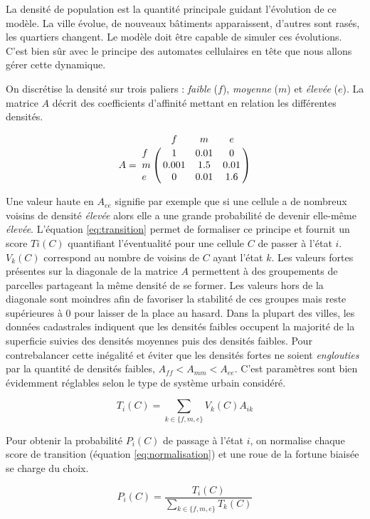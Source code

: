 \documentclass[12pt]{article}
\begin{document}
La densité de population est la quantité principale guidant
l'évolution de ce modèle. La ville évolue, de nouveaux bâtiments
apparaissent, d'autres sont rasés, les quartiers changent. Le modèle
doit être capable de simuler ces évolutions. C'est bien sûr avec le
principe des automates cellulaires en tête que nous allons gérer cette
dynamique.

On discrétise la densité sur trois paliers : \textit{faible} ($f$),
\textit{moyenne} ($m$) et \textit{élevée} ($e$). La matrice $A$ décrit
des coefficients d'affinité mettant en relation les différentes
densités.

\begin{equation}
A =
\bordermatrix{
    & f & m & e \cr
  f & 1 & 0.01 & 0 \cr
  m & 0.001 & 1.5 & 0.01 \cr
  e & 0 & 0.01 & 1.6
}
\end{equation}

Une valeur haute en $A_{ee}$ signifie par exemple que si une cellule a
de nombreux voisins de densité \textit{élevée} alors elle a une grande
probabilité de devenir elle-même \textit{élevée}. L'équation
\ref{eq:transition} permet de formaliser ce principe et fournit un
score $Ti(C)$ quantifiant l'éventualité pour une cellule $C$ de passer
à l'état $i$. $V_k(C)$ correspond au nombre de voisins de $C$ ayant
l'état $k$. Les valeurs fortes présentes sur la diagonale de la
matrice $A$ permettent à des groupements de parcelles partageant la
même densité de se former. Les valeurs hors de la diagonale sont
moindres afin de favoriser la stabilité de ces groupes mais reste
supérieures à 0 pour laisser de la place au hasard. Dans la plupart
des villes, les données cadastrales indiquent que les densités faibles
occupent la majorité de la superficie suivies des densités moyennes
puis des densités faibles. Pour contrebalancer cette inégalité et
éviter que les densités fortes ne soient \textit{englouties} par la
quantité de densités faibles, $A_{ff} < A_{mm} < A_{ee}$. C'est
paramètres sont bien évidemment réglables selon le type de système
urbain considéré.

\begin{equation}
T_i(C) = \sum_{k \in \{f,m,e\}} V_k(C) A_{ik}
\label{eq:transition}
\end{equation}

Pour obtenir la probabilité $P_i(C)$ de passage à l'état $i$, on
normalise chaque score de transition (équation \ref{eq:normalisation})
et une roue de la fortune biaisée se charge du choix.

\begin{equation}
P_i(C) = \frac{T_i(C)}{\sum_{k \in \{f,m,e\}} T_k(C)}
\label{eq:normalisation}
\end{equation}
\end{document}
